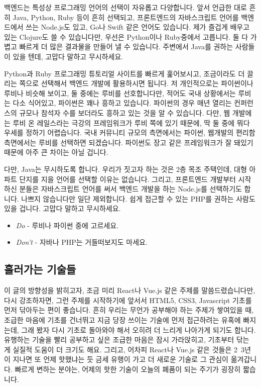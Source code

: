 \documentclass[11pt,a4paper]{article}
\begin{document}
백엔드는 특성상 프로그래밍 언어의 선택이 자유롭고 다양합니다. 앞서 언급한 대로 흔히 \textsf{Java, Python, Ruby} 등이 흔히 선택되고,  프론트엔드의 자바스크립트 언어를 백엔드에서 쓰는 \textsf{Node.js}도 있고, \textsf{Go}나 \textsf{Swift} 같은 언어도 있습니다. 제가 즐겁게 배우고 있는 \textsf{Clojure}도 쓸 수 있습니다만, 우선은 \textsf{Python}이나 \textsf{Ruby}중에서 고릅니다. 둘 다 가볍고 빠르게 더 많은 결과물을 만들어 낼 수 있습니다. 주변에서 \textsf{Java}를 권하는 사람들이 있을 텐데, 고맙다 말하고 무시하세요.

\textsf{Python}과 \textsf{Ruby} 프로그래밍 튜토리얼 사이트를 빠르게 훑어보시고, 조금이라도 더 끌리는 쪽으로 선택해서 백엔드 개발에 활용하시면 됩니다. 저 개인적으로는 \textsf{파이썬}이나 \textsf{루비}나 비슷해 보이고, 둘 중에는 \textsf{루비}를 선호합니다만, 적어도 국내 상황에서는 \textsf{루비}는 다소 식어있고, \textsf{파이썬}은 꽤나 흥하고 있습니다. \textsf{파이썬}의 경우 매년 열리는 컨퍼런스의 규모나 참석자 수를 보더라도 흥하고 있는 것을 알 수 있습니다. 다만, 웹 개발에는 \textsf{루비 온 레일스}라는 극강의 프레임워크가 \textsf{루비} 쪽에 있기 때문에, 딱 둘 중에 뭐다 우세를 정하기 어렵습니다. 국내 커뮤니티 규모의 측면에서는 \textsf{파이썬}, 웹개발의 편리함 측면에서는 \textsf{루비}를 선택하면 되겠습니다. \textsf{파이썬}도 \textsf{장고} 같은 프레임워크가 잘 돼있기 때문에 아주 큰 차이는 아닐 겁니다.

다만, \textsf{Java}는 무시하도록 합니다. 우리가 짓고자 하는 것은 2층 목조 주택인데, 대형 아파트 단지를 지을 언어를 선택할 이유는 없습니다. 그리고, 프론트엔드 개발부터 시작하신 분들은 자바스크립트 언어를 써서 백엔드 개발을 하는 \textsf{Node.js}를 선택하기도 합니다. 나쁘지 않습니다만 일단 제외합니다. 쉽게 접근할 수 있는 \textsf{PHP}를 권하는 사람도 있을 겁니다. 고맙다 말하고 무시하세요.

\begin{itemize}
\item \emph{Do} -  루비나 파이썬 중에 고르세요.
\item \emph{Don't} - 자바나 PHP는 거들떠보지도 마세요.
\end{itemize}

\subsection{흘러가는 기술들}

이 글의 방향성을 밝히고자, 조금 미리 \textsf{React나 Vue.js} 같은 주제를 말씀드렸습니다만, 다시 강조하자면, 그런 주제를 시작하기에 앞서서 \textsf{HTML5, CSS3, Javascript} 기초를 먼저 닦아두는 편이 좋습니다. 흔히 우리는 무언가 공부해야 하는 주제가 쌓여있을 때, 조급한 마음에 기초를 건너뛰고 지금 당장 쓰이는 기술에 먼저 접근하려는 유혹에 빠지는데, 그래 봤자 다시 기초로 돌아와야 해서 오히려 더 느리게 나아가게 되기도 합니다. 유행하는 기술을 빨리 공부하고 싶은 조급한 마음은 잠시 가라앉히고, 기초부터 닦는 게 실질적 도움이 더 크기도 해요. 그리고, 어차피 \textsf{React나 Vue.js} 같은 것들은 2~3년이 지나면 또 언제 핫했냐는 듯 금세 유행이 가고 더 새로운 기술로 그 관심이 옮겨갑니다. 빠르게 변하는 분야는, 어제의 핫한 기술이 오늘의 폐품이 되는 주기가 굉장히 짧습니다.
\end{document}
